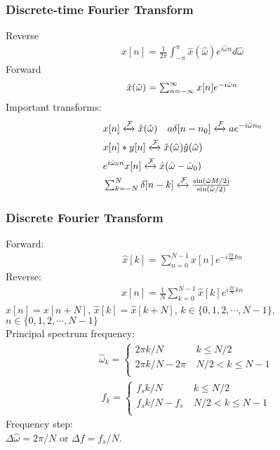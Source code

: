 \documentclass[6pt,landscape,a4paper]{article}
\begin{document}
\begin{multicols*}{5}
\subsubsection*{Discrete-time Fourier Transform}
Reverse
\vspace{-1em}
\begin{align*}
x[n]=\frac{1}{2\pi}\textstyle\int_{-\pi}^{\pi}\hat{x}(\hat{\omega})e^{i\hat{\omega}n}d\hat{\omega}
\end{align*}
Forward
\vspace{-1em}
\begin{align*}
\hat{x}(\hat{\omega})=\textstyle\textstyle\sum_{n=-\infty}^{\infty} x[n] e^{-i\hat{\omega} n}
\end{align*}
Important transforms:
\begin{align*}
&x[n]  \xleftrightarrow{\mathcal{F}} \hat{x}(\hat{\omega}) \hspace{1em} a \delta[n-n_0] \xleftrightarrow{\mathcal{F}} a e^{-i\hat{\omega}n_0}  \\
&x[n]*y[n] \xleftrightarrow{\mathcal{F}} \hat{x}(\hat{\omega})\hat{y}(\hat{\omega}) \\ &e^{i\hat{\omega}_0 n}x[n] \xleftrightarrow{\mathcal{F}} \hat{x}(\hat{\omega} - \hat{\omega}_0)\\
&\textstyle\sum_{k=-N}^{N} \delta[n-k] \xleftrightarrow{\mathcal{F}} \frac{\sin(\hat{\omega}M/2)}{\sin(\hat{\omega}/2)}
\end{align*}
\subsubsection*{Discrete Fourier Transform}
Forward:
\vspace{-1em}
\begin{align*}
\hat{x}[k] = \textstyle\sum_{n=0}^{N-1}x[n]e^{-i\frac{2\pi}{N}kn}
\end{align*}
Reverse:
\vspace{-1em}
\begin{align*}
x[n] = \frac{1}{N}\textstyle\sum_{k=0}^{N-1}\hat{x}[k]e^{i\frac{2\pi}{N}kn}
\end{align*}
$x[n]=x[n+N]$, $\hat{x}[k]=\hat{x}[k+N]$, $k\in \{0,1,2,\cdots,N-1\}$, $n\in \{0,1,2,\cdots,N-1\}$\\
Principal spectrum frequency:
\begin{align*}
&  \hat{\omega}_k = \left\{\begin{array}{cl}
    2\pi k/N & ~  k \le N/2   \\
    2\pi k/N - 2\pi & ~  N/2 < k \le N-1 \\
  \end{array}
  \right.
\end{align*}
\begin{align*}
&  f_k = \left\{\begin{array}{cl}
    f_s k/N & ~  k \le N/2   \\
    f_s k/N - f_s & ~  N/2 < k \le N-1 \\
  \end{array}
  \right.
\end{align*}
\fi
Frequency step: \\
$\Delta{\hat{\omega}}=2\pi/N$ or $\Delta f = f_s/N$.


\end{multicols*}
\end{document}
